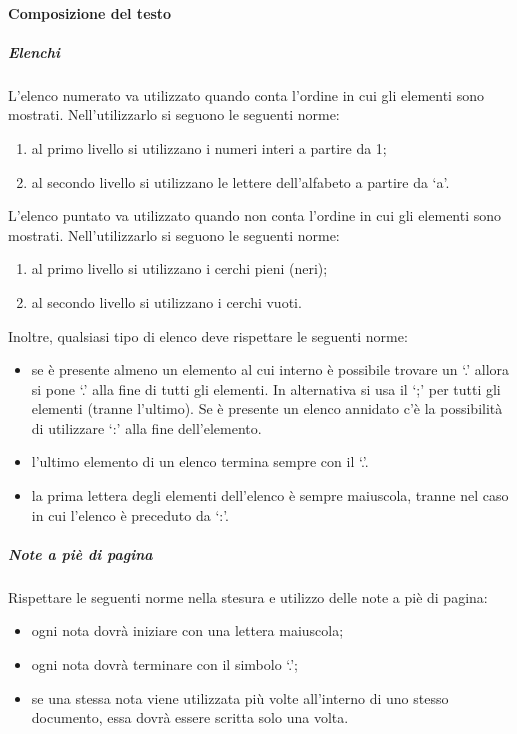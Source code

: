 			\paragraph{Composizione del testo}
				\subparagraph{Elenchi}
					L’elenco numerato va utilizzato quando conta l’ordine in cui gli elementi sono mostrati. Nell’utilizzarlo si seguono le seguenti norme:
					\begin{enumerate}
						\item al primo livello si utilizzano i numeri interi a partire da 1;
						\item al secondo livello si utilizzano le lettere dell’alfabeto a partire da ‘a’.
					\end{enumerate}
					L’elenco puntato va utilizzato quando non conta l’ordine in cui gli elementi sono mostrati. Nell’utilizzarlo si seguono le seguenti norme:
					\begin{enumerate}
						\item al primo livello si utilizzano i cerchi pieni (neri);
						\item al secondo livello si utilizzano i cerchi vuoti.
					\end{enumerate}
					Inoltre, qualsiasi tipo di elenco deve rispettare le seguenti norme:
					\begin{itemize}
						\item se è presente almeno un elemento al cui interno è possibile trovare un ‘.’ allora si pone ‘.’ alla fine di tutti gli elementi. In alternativa si usa il ‘;’ per tutti gli elementi (tranne l’ultimo). Se è presente un elenco annidato c’è la possibilità di utilizzare ‘:’ alla fine dell’elemento.
						\item l’ultimo elemento di un elenco termina sempre con il ‘.’.
						\item la prima lettera degli elementi dell’elenco è sempre maiuscola, tranne nel caso in cui l’elenco è preceduto da ‘:’.
					\end{itemize}
				\subparagraph{Note a piè di pagina}
					Rispettare le seguenti norme nella stesura e utilizzo delle note a piè di pagina:
					\begin{itemize}
						\item ogni nota dovrà iniziare con una lettera maiuscola;
						\item ogni nota dovrà terminare con il simbolo ‘.’;
						\item se una stessa nota viene utilizzata più volte all’interno di uno stesso documento, essa dovrà essere scritta solo una volta.
					\end{itemize}
